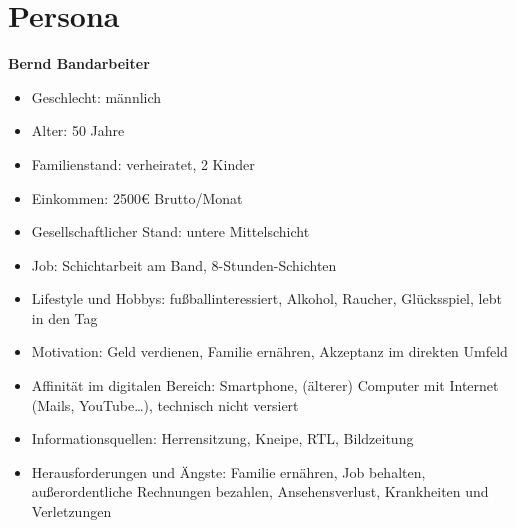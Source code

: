 \section{Persona}
\textbf{Bernd Bandarbeiter}
\begin{itemize}
\item Geschlecht: männlich
\item Alter: 50 Jahre
\item Familienstand: verheiratet, 2 Kinder
\item Einkommen: 2500€ Brutto/Monat
\item Gesellschaftlicher Stand: untere Mittelschicht
\item Job: Schichtarbeit am Band, 8-Stunden-Schichten
\item Lifestyle und Hobbys: fußballinteressiert, Alkohol, Raucher, Glücksspiel, lebt in den Tag
\item Motivation: Geld verdienen, Familie ernähren, Akzeptanz im direkten Umfeld
\item Affinität im digitalen Bereich: Smartphone, (älterer) Computer mit Internet (Mails, YouTube…), technisch nicht versiert
\item Informationsquellen: Herrensitzung, Kneipe, RTL, Bildzeitung
\item Herausforderungen und Ängste: Familie ernähren, Job behalten, außerordentliche Rechnungen bezahlen, Ansehensverlust, Krankheiten und Verletzungen
\end{itemize}
